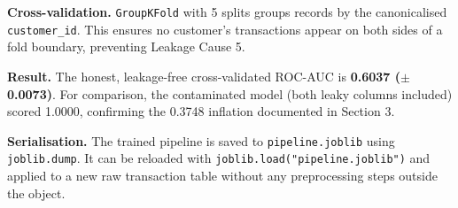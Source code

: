 \documentclass[11pt,a4paper]{article}
\begin{document}
\textbf{Cross-validation.} \texttt{GroupKFold} with 5 splits groups records by the
canonicalised \texttt{customer\_id}. This ensures no customer's transactions appear on
both sides of a fold boundary, preventing Leakage Cause 5.

\textbf{Result.} The honest, leakage-free cross-validated ROC-AUC is
\textbf{0.6037 ($\pm$0.0073)}. For comparison, the contaminated model (both leaky columns
included) scored 1.0000, confirming the 0.3748 inflation documented in Section 3.

\textbf{Serialisation.} The trained pipeline is saved to \texttt{pipeline.joblib} using
\texttt{joblib.dump}. It can be reloaded with \texttt{joblib.load("pipeline.joblib")} and
applied to a new raw transaction table without any preprocessing steps outside the object.
\end{document}
